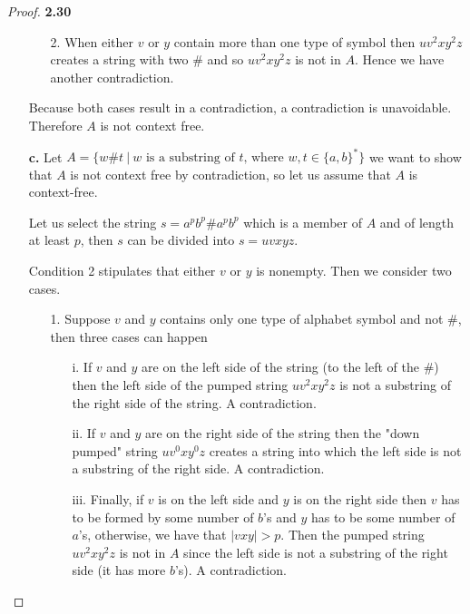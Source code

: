 \documentclass[11pt]{article}
\theoremstyle{definition}
\begin{document}
\begin{proof}{\textbf{2.30}}
\begin{itemize}
\begin{itemize}
        \item [2.] When either $v$ or $y$ contain more than one type of symbol
        then $uv^2xy^2z$ creates a string with two $\#$ and so 
        $uv^2xy^2z$ is not in $A$. Hence we have another contradiction.
    \end{itemize}
    Because both cases result in a contradiction, a contradiction is
    unavoidable. Therefore $A$ is not context free.

\cleardoublepage
    \item [\textbf{c.}]
    Let $A = \{w\#t~|~w \text{ is a substring of $t$, where } w,t \in \{a,b\}^*\}$
    we want to show  that $A$ is not context free by contradiction, so let us
    assume that $A$ is context-free.

    Let us select the string $s = a^pb^p\#a^pb^p$ which is a member of $A$ and
    of length at least $p$, then $s$ can be divided into $s = uvxyz$.

    Condition 2 stipulates that either $v$ or $y$ is nonempty. Then we consider
    two cases.
    \begin{itemize}
        \item [1.] Suppose $v$ and $y$ contains only one type of alphabet
        symbol and not $\#$, then three cases can happen
        \begin{itemize}
            \item [i.] If $v$ and $y$ are on the left side of the string
            (to the left of the $\#$) then the left side of the pumped string
            $uv^2xy^2z$ is not a substring of the right side of the string.
            A contradiction.
            \item [ii.] If $v$ and $y$ are on the right side of the string
            then the "down pumped" string $uv^0xy^0z$ creates a string into
            which the left side is not a substring of the right side.
            A contradiction.
            \item [iii.] Finally, if $v$ is on the left side and $y$ is on the
            right side then $v$ has to be formed by some number of $b$'s and
            $y$ has to be some number of $a$'s, otherwise, we have that
            $|vxy| > p$. Then the pumped string $uv^2xy^2z$ is not in $A$ since
            the left side is not a substring of the right side
            (it has more $b$'s). A contradiction.
        \end{itemize}


\end{itemize}
\end{itemize}
\end{proof}
\end{document}
